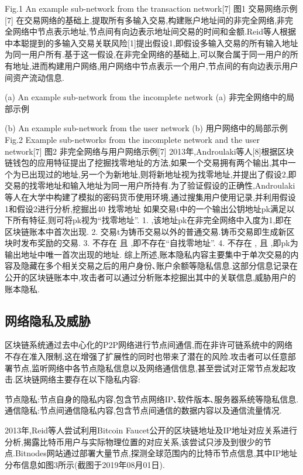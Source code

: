 Fig.1  An example sub-network from the transaction network[7]
图1  交易网络示例[7]
    在交易网络的基础上,提取所有多输入交易,构建账户地址间的非完全网络,非完全网络中节点表示地址,节点间有向边表示地址间交易的时间和金额.Reid等人根据中本聪提到的多输入交易关联风险[1]提出假设1,即假设多输入交易的所有输入地址为同一用户所有.基于这一假设,在非完全网络的基础上,可以聚合属于同一用户的所有地址,进而构建用户网络,用户网络中节点表示一个用户,节点间的有向边表示用户间资产流动信息.
 
(a) An example sub-network from the incomplete network
(a) 非完全网络中的局部示例
 
(b) An example sub-network from the user network
(b) 用户网络中的局部示例
Fig.2  Example sub-networks from the incomplete network and the user network[7]
图2  非完全网络与用户网络示例[7]
	2013年,Androulaki等人[8]根据区块链钱包的应用特征提出了挖掘找零地址的方法,如果一个交易拥有两个输出,其中一个为已出现过的地址,另一个为新地址,则将新地址视为找零地址,并提出了假设2,即交易的找零地址和输入地址为同一用户所持有.为了验证假设的正确性,Androulaki等人在大学中构建了模拟的密码货币使用环境,通过搜集用户使用记录,并利用假设1和假设2进行分析,挖掘出40%
	找零地址 如果交易t中的一个输出公钥地址pk满足以下所有特征,则可将pk视为“找零地址”.
1.	 ,该地址pk在非完全网络中入度为1,即在区块链账本中首次出现.
2.	交易t为铸币交易以外的普通交易.铸币交易即生成新区块时发布奖励的交易.
3.	不存在 且 ,即不存在“自找零地址”.
4.	不存在 , 且 ,即pk为输出地址中唯一首次出现的地址.
综上所述,账本隐私内容主要集中于单次交易的内容及隐藏在多个相关交易之后的用户身份､账户余额等隐私信息.这部分信息记录在公开的区块链账本中,攻击者可以通过分析账本挖掘出其中的关联信息,威胁用户的账本隐私.

\subsection{网络隐私及威胁}

区块链系统通过去中心化的P2P网络进行节点间通信,而在非许可链系统中的网络不存在准入限制,这在增强了扩展性的同时也带来了潜在的风险.攻击者可以任意部署节点,监听网络中各节点隐私信息以及网络通信信息,甚至尝试对正常节点发起攻击.区块链网络主要存在以下隐私内容:

节点隐私:节点自身的隐私内容,包含节点网络IP､软件版本､服务器系统等隐私信息.
通信隐私:节点间通信隐私内容,包含节点间通信的数据内容以及通信流量情况.

2013年,Reid等人尝试利用Bitcoin Faucet公开的区块链地址及IP地址对应关系进行分析,揭露比特币用户与实际物理位置的对应关系,该尝试只涉及到很少的节点.Bitnodes网站通过部署大量节点,探测全球范围内的比特币节点信息,其中IP地址分布信息如图3所示(截图于2019年08月01日).


